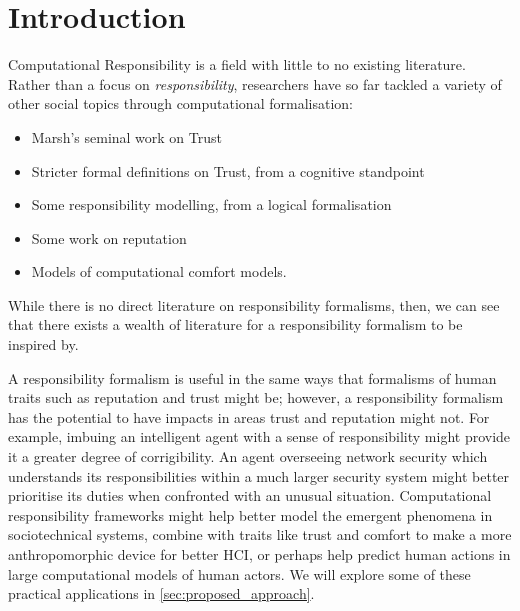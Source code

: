 \section{Introduction}\label{sec:intro}

Computational Responsibility is a field with little to no existing literature. Rather than a focus on \emph{responsibility}, researchers have so far tackled a variety of other social topics through computational formalisation:

\begin{itemize}
    \item Marsh's seminal work on Trust\cite{Marsh1994FormalisingConcept}
    
    \item Stricter formal definitions on Trust, from a cognitive standpoint\cite{CastelfranchiSocialApproach}
    
    \item Some responsibility modelling, from a logical formalisation\cite{Simpson2015FormalisingAnalysis}
    
    \item Some work on reputation~\cite{Chandrasekaran2011ASystems}

    \item Models of computational comfort models\cite{Marsh2011}.
    
\end{itemize}

While there is no direct literature on responsibility formalisms, then, we can see that there exists a wealth of literature for a responsibility formalism to be inspired by.\par

A responsibility formalism is useful in the same ways that formalisms of human traits such as reputation and trust might be; however, a responsibility formalism has the potential to have impacts in areas trust and reputation might not. For example, imbuing an intelligent agent with a sense of responsibility might provide it a greater degree of corrigibility\cite{corrigibility}. An agent overseeing network security which understands its responsibilities within a much larger security system might better prioritise its duties when confronted with an unusual situation. Computational responsibility frameworks might help better model the emergent phenomena in sociotechnical systems, combine with traits like trust and comfort to make a more anthropomorphic device for better HCI, or perhaps help predict human actions in large computational models of human actors. We will explore some of these practical applications in \cref{sec:proposed_approach}.\par


